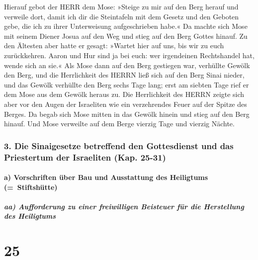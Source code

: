  Hierauf gebot der HERR dem Mose: »Steige zu mir auf den
Berg herauf und verweile dort, damit ich dir die Steintafeln mit dem
Gesetz und den Geboten gebe, die ich zu ihrer Unterweisung
aufgeschrieben habe.«  Da machte sich Mose mit seinem
Diener Josua auf den Weg und stieg auf den Berg Gottes hinauf.
 Zu den Ältesten aber hatte er gesagt: »Wartet hier auf
uns, bis wir zu euch zurückkehren. Aaron und Hur sind ja bei euch: wer
irgendeinen Rechtshandel hat, wende sich an sie.«  Als
Mose dann auf den Berg gestiegen war, verhüllte Gewölk den Berg,
 und die Herrlichkeit des HERRN ließ sich auf den Berg
Sinai nieder, und das Gewölk verhüllte den Berg sechs Tage lang; erst am
siebten Tage rief er dem Mose aus dem Gewölk heraus zu. 
Die Herrlichkeit des HERRN zeigte sich aber vor den Augen der Israeliten
wie ein verzehrendes Feuer auf der Spitze des Berges.  Da
begab sich Mose mitten in das Gewölk hinein und stieg auf den Berg
hinauf. Und Mose verweilte auf dem Berge vierzig Tage und vierzig
Nächte.

\hypertarget{die-sinaigesetze-betreffend-den-gottesdienst-und-das-priestertum-der-israeliten-kap.-25-31}{%
\subsubsection{3. Die Sinaigesetze betreffend den Gottesdienst und das
Priestertum der Israeliten (Kap.
25-31)}\label{die-sinaigesetze-betreffend-den-gottesdienst-und-das-priestertum-der-israeliten-kap.-25-31}}

\hypertarget{a-vorschriften-uxfcber-bau-und-ausstattung-des-heiligtums-stiftshuxfctte}{%
\paragraph{a) Vorschriften über Bau und Ausstattung des Heiligtums
(=~Stiftshütte)}\label{a-vorschriften-uxfcber-bau-und-ausstattung-des-heiligtums-stiftshuxfctte}}

\hypertarget{aa-aufforderung-zu-einer-freiwilligen-beisteuer-fuxfcr-die-herstellung-des-heiligtums}{%
\subparagraph{aa) Aufforderung zu einer freiwilligen Beisteuer für die
Herstellung des
Heiligtums}\label{aa-aufforderung-zu-einer-freiwilligen-beisteuer-fuxfcr-die-herstellung-des-heiligtums}}

\hypertarget{section-24}{%
\section{25}\label{section-24}}

